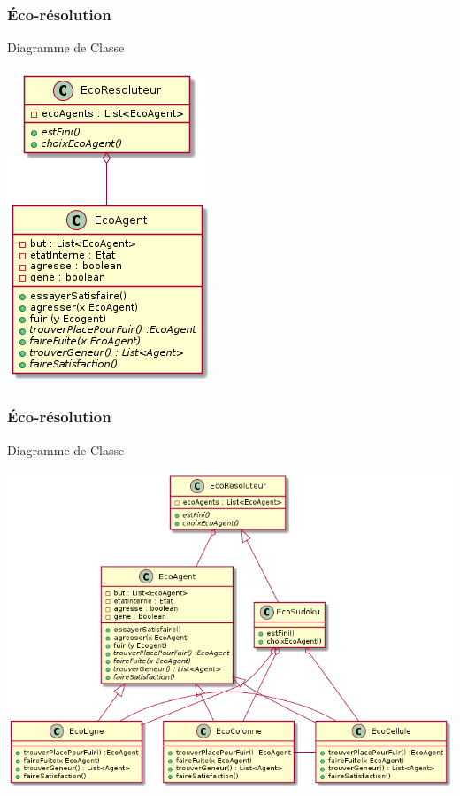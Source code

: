 
\begin{frame}
    \frametitle{Éco-résolution}
    
    		\begin{block}{Diagramme de Classe}
    		\begin{center}
     \includegraphics[scale=0.4]{diagrams/ClasseEcoResolution1.png}
    \end{center}
    		    

    		\end{block}

\end{frame}

\begin{frame}
    \frametitle{Éco-résolution}
    		\begin{block}{Diagramme de Classe}
    		\begin{center}
    		
    		     \includegraphics[scale=0.3]{diagrams/ClasseEcoResolution2.png}
    		\end{center}

    		\end{block}

\end{frame}

